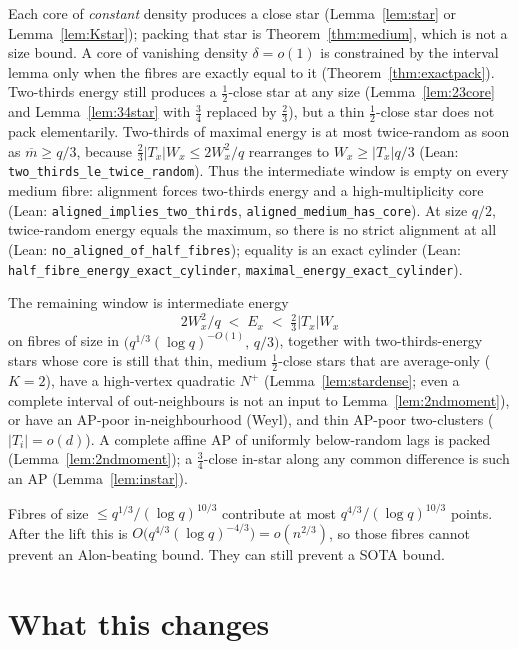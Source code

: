\documentclass[11pt]{article}
\theoremstyle{definition}
\begin{document}
Each core of \emph{constant} density produces a close star
(Lemma~\ref{lem:star} or Lemma~\ref{lem:Kstar}); packing that star is
Theorem~\ref{thm:medium}, which is not a size bound.
A core of vanishing density $\delta=o(1)$ is constrained by the interval lemma only when the fibres are exactly equal to it (Theorem~\ref{thm:exactpack}).
Two-thirds energy still produces a $\tfrac12$-close star at any size
(Lemma~\ref{lem:23core} and Lemma~\ref{lem:34star} with $\tfrac34$
replaced by $\tfrac23$), but a thin $\tfrac12$-close star does not pack
elementarily.
Two-thirds of maximal energy is at most twice-random as soon as
$\overline m\ge q/3$, because
$\tfrac23|T_x|W_x\le 2W_x^{2}/q$ rearranges to $W_x\ge |T_x|q/3$
(Lean: \texttt{two\_thirds\_le\_twice\_random}).
Thus the intermediate window is empty on every medium fibre:
alignment forces two-thirds energy and a high-multiplicity core
(Lean: \texttt{aligned\_implies\_two\_thirds},
\texttt{aligned\_medium\_has\_core}).
At size $q/2$, twice-random energy equals the maximum, so there is no
strict alignment at all
(Lean: \texttt{no\_aligned\_of\_half\_fibres});
equality is an exact cylinder
(Lean: \texttt{half\_fibre\_energy\_exact\_cylinder},
\texttt{maximal\_energy\_exact\_cylinder}).

The remaining window is intermediate energy
\[
  2W_x^{2}/q\;<\;E_x\;<\;\tfrac23|T_x|W_x
\]
on fibres of size in $\bigl(q^{1/3}(\log q)^{-O(1)},\,q/3\bigr)$,
together with two-thirds-energy stars whose core is still that thin,
medium $\tfrac12$-close stars that are average-only ($K=2$),
have a high-vertex quadratic $N^+$
(Lemma~\ref{lem:stardense}; even a complete interval of out-neighbours
is not an input to Lemma~\ref{lem:2ndmoment}),
or have an AP-poor in-neighbourhood (Weyl),
and thin AP-poor two-clusters ($|T_i|=o(d)$).
A complete affine AP of uniformly below-random lags is packed
(Lemma~\ref{lem:2ndmoment}); a $\tfrac34$-close in-star along any
common difference is such an AP (Lemma~\ref{lem:instar}).

Fibres of size $\le q^{1/3}/(\log q)^{10/3}$ contribute at most $q^{4/3}/(\log q)^{10/3}$ points.
After the lift this is $O\bigl(q^{4/3}(\log q)^{-4/3}\bigr)=o(n^{2/3})$, so those fibres cannot prevent an Alon-beating bound.
They can still prevent a SOTA bound.

\section{What this changes}
\end{document}

